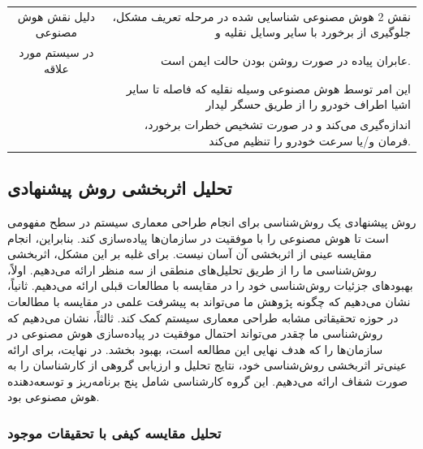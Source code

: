 \documentclass[a4paper,10pt]{article}
\begin{document}
\begin{table}[htbp]
\begin{tabularx}{\textwidth}{c c c c X}
                    \multicolumn{2}{c}{دلیل نقش هوش مصنوعی} & \multicolumn{3}{r}{نقش 2 هوش مصنوعی شناسایی شده در مرحله تعریف مشکل، جلوگیری از برخورد با سایر وسایل نقلیه و} \\
                    \multicolumn{2}{c}{در سیستم مورد علاقه} & \multicolumn{3}{r}{عابران پیاده در صورت روشن بودن حالت ایمن است.} \\
                    \multicolumn{2}{c}{} & \multicolumn{3}{r}{این امر توسط هوش مصنوعی وسیله نقلیه که فاصله تا سایر اشیا اطراف خودرو را از طریق حسگر لیدار} \\
                    \multicolumn{2}{c}{} & \multicolumn{3}{r}{اندازه‌گیری می‌کند و در صورت تشخیص خطرات برخورد، فرمان و/یا سرعت خودرو را تنظیم می‌کند.} \\

                    \hline

                \end{tabularx}
                
            \end{table}

            \subsection{تحلیل اثربخشی روش پیشنهادی}

                روش پیشنهادی یک روش‌شناسی برای انجام طراحی معماری سیستم در سطح مفهومی است تا هوش مصنوعی را با موفقیت در سازمان‌ها پیاده‌سازی کند. بنابراین، انجام مقایسه عینی از اثربخشی آن آسان نیست. برای غلبه بر این مشکل، اثربخشی روش‌شناسی ما را از طریق تحلیل‌های منطقی از سه منظر ارائه می‌دهیم. اولاً، بهبودهای جزئیات روش‌شناسی خود را در مقایسه با مطالعات قبلی ارائه می‌دهیم. ثانیاً، نشان می‌دهیم که چگونه پژوهش ما می‌تواند به پیشرفت علمی در مقایسه با مطالعات در حوزه تحقیقاتی مشابه طراحی معماری سیستم کمک کند. ثالثاً، نشان می‌دهیم که روش‌شناسی ما چقدر می‌تواند احتمال موفقیت در پیاده‌سازی هوش مصنوعی در سازمان‌ها را که هدف نهایی این مطالعه است، بهبود بخشد. در نهایت، برای ارائه عینی‌تر اثربخشی روش‌شناسی خود، نتایج تحلیل و ارزیابی گروهی از کارشناسان را به صورت شفاف ارائه می‌دهیم. این گروه کارشناسی شامل پنج برنامه‌ریز و توسعه‌دهنده هوش مصنوعی بود.

                \subsubsection{تحلیل مقایسه کیفی با تحقیقات موجود}
\end{document}
